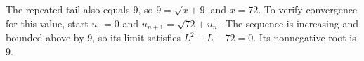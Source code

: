 The repeated tail also equals $9$, so $9=\sqrt{x+9}$ and $\boxed{x=72}$. To verify convergence for this value, start $u_0=0$ and $u_{n+1}=\sqrt{72+u_n}$. The sequence is increasing and bounded above by $9$, so its limit satisfies $L^2-L-72=0$. Its nonnegative root is $9$.
